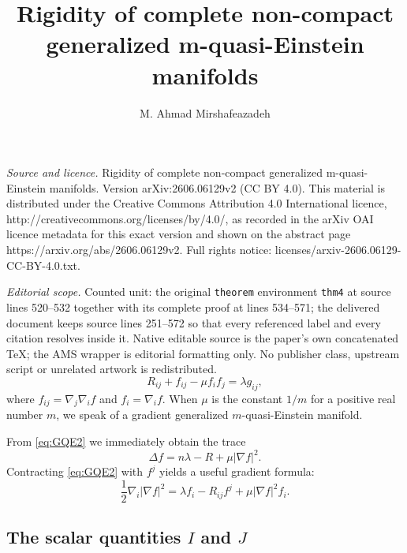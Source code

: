 \documentclass[10pt,a4paper]{amsart}
\begin{document}
\title[Rigidity of complete non-compact generalized m-quasi-Einstei]{Rigidity of complete non-compact generalized m-quasi-Einstein manifolds}
\author{M. Ahmad Mirshafeazadeh}
\date{}
\maketitle
\noindent\emph{Source and licence.} Rigidity of complete non-compact generalized m-quasi-Einstein manifolds. Version arXiv:2606.06129v2 (CC BY 4.0). This material is distributed under the Creative Commons Attribution 4.0 International licence, http://creativecommons.org/licenses/by/4.0/, as recorded in the arXiv OAI licence metadata for this exact version and shown on the abstract page https://arxiv.org/abs/2606.06129v2. Full rights notice: licenses/arxiv-2606.06129-CC-BY-4.0.txt.\par\smallskip
\noindent\textit{Editorial scope.} Counted unit: the original \texttt{theorem} environment \texttt{thm4} at source lines 520--532 together with its complete proof at lines 534--571; the delivered document keeps source lines 251--572 so that every referenced label and every citation resolves inside it. Native editable source is the paper's own concatenated TeX; the AMS wrapper is editorial formatting only. No publisher class, upstream script or unrelated artwork is redistributed.
\begin{equation}
R_{ij} + f_{ij} - \mu f_i f_j = \lambda g_{ij}, \label{eq:GQE2}
\end{equation}
where $f_{ij} = \nabla_j\nabla_i f$ and $f_i = \nabla_i f$.
When $\mu$ is the constant $1/m$ for a positive real number $m$, we speak of a gradient generalized $m$-quasi-Einstein manifold.

From \eqref{eq:GQE2} we immediately obtain the trace
\begin{equation}
\Delta f = n\lambda - R + \mu|\nabla f|^2. \label{eq:trace}
\end{equation}
Contracting \eqref{eq:GQE2} with $f^j$ yields a useful gradient formula:
\begin{equation}
\frac12\nabla_i|\nabla f|^2 = \lambda f_i - R_{ij}f^j + \mu|\nabla f|^2 f_i. \label{eq:grad}
\end{equation}

\subsection{The scalar quantities $I$ and $J$}
\end{document}
